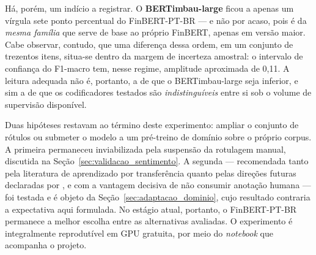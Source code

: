 Há, porém, um indício a registrar. O \textbf{BERTimbau-large} ficou a apenas um vírgula sete ponto
percentual do \mbox{FinBERT-PT-BR} --- e não por acaso, pois é da \emph{mesma família} que serve de
base ao próprio FinBERT, apenas em versão maior. Cabe observar, contudo, que uma diferença dessa
ordem, em um conjunto de trezentos itens, situa-se dentro da margem de incerteza amostral: o
intervalo de confiança do F1-macro tem, nesse regime, amplitude aproximada de 0,11. A leitura
adequada não é, portanto, a de que o BERTimbau-large seja inferior, e sim a de que os codificadores
testados são \emph{indistinguíveis} entre si sob o volume de supervisão disponível.

Duas hipóteses restavam ao término deste experimento: ampliar o conjunto de rótulos ou submeter o
modelo a um pré-treino de domínio sobre o próprio corpus. A primeira permaneceu inviabilizada pela
suspensão da rotulagem manual, discutida na Seção~\ref{sec:validacao_sentimento}. A segunda ---
recomendada tanto pela literatura de aprendizado por transferência \cite{gururangan_dont_2020}
quanto pelas direções futuras declaradas por , e com a vantagem
decisiva de não consumir anotação humana --- foi testada e é objeto da
Seção~\ref{sec:adaptacao_dominio}, cujo resultado contraria a expectativa aqui formulada. No
estágio atual, portanto, o \mbox{FinBERT-PT-BR} permanece a melhor escolha entre as alternativas
avaliadas. O experimento é integralmente reprodutível em GPU gratuita, por meio do \textit{notebook}
que acompanha o projeto.
